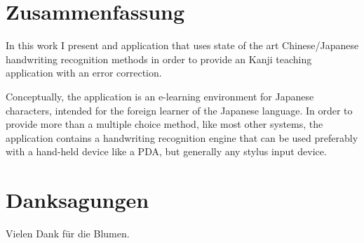 


\chapter*{Zusammenfassung}
\label{chap:zusammenfassung}

In this work I present and application that uses state of the art 
Chinese/Japanese handwriting recognition methods in order to provide 
an Kanji teaching application with an error correction.

Conceptually, the application is an e-learning environment for Japanese 
characters, intended for the foreign learner of the Japanese language. 
In order to provide more than a  multiple choice method, like most other 
systems, the application contains a handwriting recognition engine that can
be used preferably with a hand-held device like a PDA, but generally any 
stylus input device.


\chapter*{Danksagungen}
\label{chap:danksagungen}

Vielen Dank für die Blumen.
